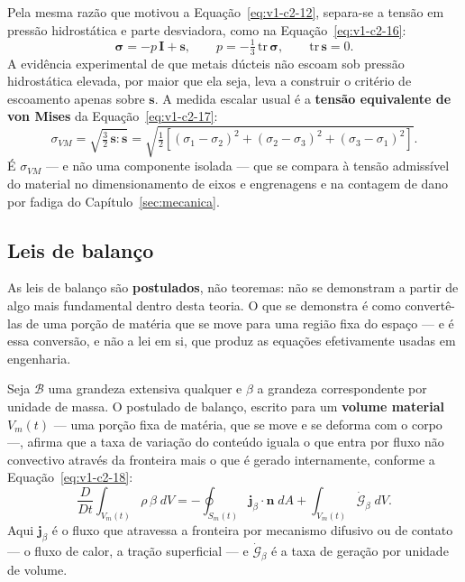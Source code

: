 \documentclass[12pt,a4paper]{article}
\numberwithin{equation}{section}
\numberwithin{table}{section}
\numberwithin{figure}{section}
\begin{document}
Pela mesma razão que motivou a Equação~\eqref{eq:v1-c2-12}, separa-se a tensão
em pressão hidrostática e parte desviadora, como na
Equação~\eqref{eq:v1-c2-16}:
\begin{equation}\label{eq:v1-c2-16}
\boldsymbol{\sigma} = -p\,\mathbf{I} + \mathbf{s},
\qquad
p = -\tfrac{1}{3}\,\mathrm{tr}\,\boldsymbol{\sigma},
\qquad
\mathrm{tr}\,\mathbf{s} = 0 .
\end{equation}
A evidência experimental de que metais dúcteis não escoam sob pressão
hidrostática elevada, por maior que ela seja, leva a construir o critério de
escoamento apenas sobre $\mathbf{s}$. A medida escalar usual é a \textbf{tensão
equivalente de von Mises} da Equação~\eqref{eq:v1-c2-17}:
\begin{equation}\label{eq:v1-c2-17}
\sigma_{VM} = \sqrt{\tfrac{3}{2}\,\mathbf{s}\!:\!\mathbf{s}}
= \sqrt{\tfrac{1}{2}\left[(\sigma_1-\sigma_2)^2 + (\sigma_2-\sigma_3)^2 +
(\sigma_3-\sigma_1)^2\right]} .
\end{equation}
É $\sigma_{VM}$ --- e não uma componente isolada --- que se compara à tensão
admissível do material no dimensionamento de eixos e engrenagens e na
contagem de dano por fadiga do Capítulo~\ref{sec:mecanica}.

\subsection{Leis de balanço}\label{sub:v1-c2-balanco}

As leis de balanço são \textbf{postulados}, não teoremas: não se demonstram a
partir de algo mais fundamental dentro desta teoria. O que se demonstra é como
convertê-las de uma porção de matéria que se move para uma região fixa do
espaço --- e é essa conversão, e não a lei em si, que produz as equações
efetivamente usadas em engenharia.

Seja $\mathcal{B}$ uma grandeza extensiva qualquer e $\beta$ a grandeza
correspondente por unidade de massa. O postulado de balanço, escrito para um
\textbf{volume material} $V_m(t)$ --- uma porção fixa de matéria, que se move e
se deforma com o corpo ---, afirma que a taxa de variação do conteúdo iguala o
que entra por fluxo não convectivo através da fronteira mais o que é gerado
internamente, conforme a Equação~\eqref{eq:v1-c2-18}:
\begin{equation}\label{eq:v1-c2-18}
\frac{D}{Dt}\int_{V_m(t)} \rho\,\beta \; dV =
-\oint_{S_m(t)} \mathbf{j}_\beta \cdot \mathbf{n} \; dA +
\int_{V_m(t)} \dot{\mathcal{G}}_\beta \; dV .
\end{equation}
Aqui $\mathbf{j}_\beta$ é o fluxo que atravessa a fronteira por mecanismo
difusivo ou de contato --- o fluxo de calor, a tração superficial --- e
$\dot{\mathcal{G}}_\beta$ é a taxa de geração por unidade de volume.
\end{document}
